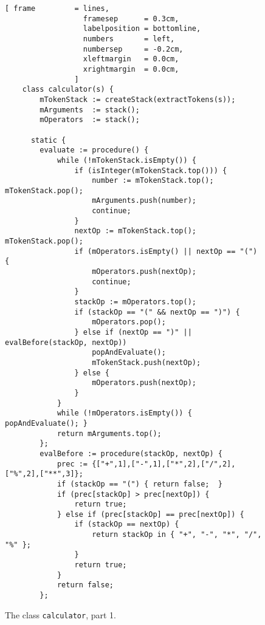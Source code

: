 \begin{figure}[!b]
  \centering
\begin{Verbatim}[ frame         = lines, 
                  framesep      = 0.3cm, 
                  labelposition = bottomline,
                  numbers       = left,
                  numbersep     = -0.2cm,
                  xleftmargin   = 0.0cm,
                  xrightmargin  = 0.0cm,
                ]
    class calculator(s) {
        mTokenStack := createStack(extractTokens(s));
        mArguments  := stack();
        mOperators  := stack();
    
      static {
        evaluate := procedure() {
            while (!mTokenStack.isEmpty()) {
                if (isInteger(mTokenStack.top())) {
                    number := mTokenStack.top(); mTokenStack.pop();
                    mArguments.push(number);
                    continue;
                } 
                nextOp := mTokenStack.top(); mTokenStack.pop();
                if (mOperators.isEmpty() || nextOp == "(") {
                    mOperators.push(nextOp);
                    continue;
                }
                stackOp := mOperators.top();
                if (stackOp == "(" && nextOp == ")") {
                    mOperators.pop();
                } else if (nextOp == ")" || evalBefore(stackOp, nextOp))
                    popAndEvaluate();
                    mTokenStack.push(nextOp);
                } else {
                    mOperators.push(nextOp);
                }
            }
            while (!mOperators.isEmpty()) { popAndEvaluate(); }
            return mArguments.top();
        };
        evalBefore := procedure(stackOp, nextOp) {
            prec := {["+",1],["-",1],["*",2],["/",2],["%",2],["**",3]};
            if (stackOp == "(") { return false;  }
            if (prec[stackOp] > prec[nextOp]) {
                return true;
            } else if (prec[stackOp] == prec[nextOp]) {
                if (stackOp == nextOp) {
                    return stackOp in { "+", "-", "*", "/", "%" };
                }
                return true;
            } 
            return false;
        };
\end{Verbatim}
\vspace*{-0.3cm}
  \caption{The class \texttt{calculator}, part 1.}
  \label{fig:calculator.setlx-1}
\end{figure} 

